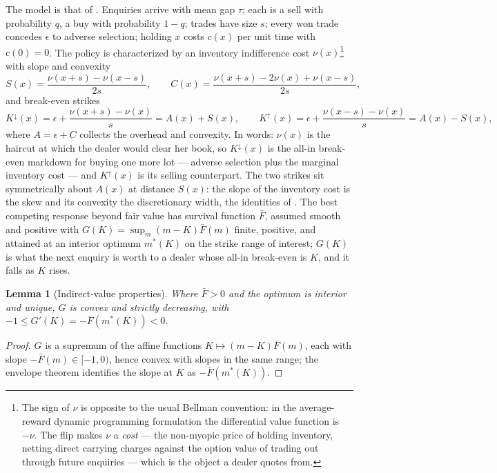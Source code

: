 \documentclass[11pt]{article}
\newtheorem{lemma}{Lemma}
\newcommand{\Fbar}{\bar F}
\begin{document}
The model is that of \citet{cotton2026skew}. Enquiries arrive with mean gap $\tau$; each is a sell with probability $q$, a buy with probability $1-q$; trades have size $s$; every won trade concedes $\epsilon$ to adverse selection; holding $x$ costs $c(x)$ per unit time with $c(0)=0$. The policy is characterized by an inventory indifference cost $\nu(x)$\footnote{The sign of $\nu$ is opposite to the usual Bellman convention: in the average-reward dynamic programming formulation the differential value function is $-\nu$. The flip makes $\nu$ a \emph{cost} --- the non-myopic price of holding inventory, netting direct carrying charges against the option value of trading out through future enquiries --- which is the object a dealer quotes from.} with slope and convexity
\[
S(x) = \frac{\nu(x+s)-\nu(x-s)}{2s}, \qquad
C(x) = \frac{\nu(x+s)-2\nu(x)+\nu(x-s)}{2s},
\]
and break-even strikes
\begin{equation}
K^{\downarrow}(x) = \epsilon + \frac{\nu(x+s)-\nu(x)}{s} = A(x) + S(x), \qquad
K^{\uparrow}(x) = \epsilon + \frac{\nu(x-s)-\nu(x)}{s} = A(x) - S(x),
\label{eq:strikes}
\end{equation}
where $A = \epsilon + C$ collects the overhead and convexity. In words: $\nu(x)$ is the haircut at which the dealer would clear her book, so $K^{\downarrow}(x)$ is the all-in break-even markdown for buying one more lot --- adverse selection plus the marginal inventory cost --- and $K^{\uparrow}(x)$ is its selling counterpart. The two strikes sit symmetrically about $A(x)$ at distance $S(x)$: the slope of the inventory cost is the skew and its convexity the discretionary width, the identities of \citet{cotton2026skew}. The best competing response beyond fair value has survival function $\Fbar$, assumed smooth and positive with $G(K) = \sup_m (m-K)\Fbar(m)$ finite, positive, and attained at an interior optimum $m^\ast(K)$ on the strike range of interest; $G(K)$ is what the next enquiry is worth to a dealer whose all-in break-even is $K$, and it falls as $K$ rises.

\begin{lemma}[Indirect-value properties]\label{lem:indirect}
Where $\Fbar > 0$ and the optimum is interior and unique, $G$ is convex and strictly decreasing, with $-1 \le G'(K) = -\Fbar(m^\ast(K)) < 0$.
\end{lemma}

\begin{proof}
$G$ is a supremum of the affine functions $K \mapsto (m-K)\Fbar(m)$, each with slope $-\Fbar(m) \in [-1, 0)$, hence convex with slopes in the same range; the envelope theorem identifies the slope at $K$ as $-\Fbar(m^\ast(K))$.
\end{proof}
\end{document}
